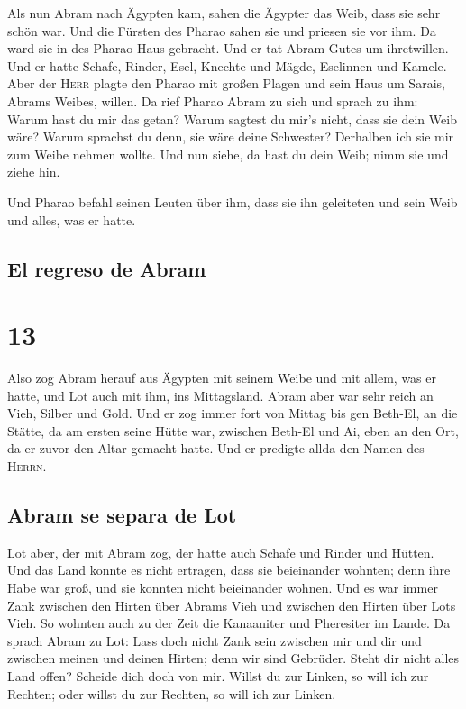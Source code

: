  Als nun Abram nach Ägypten kam, sahen die Ägypter das
Weib, dass sie sehr schön war.  Und die Fürsten des
Pharao sahen sie und priesen sie vor ihm. Da ward sie in des Pharao Haus
gebracht.  Und er tat Abram Gutes um ihretwillen. Und er
hatte Schafe, Rinder, Esel, Knechte und Mägde, Eselinnen und Kamele.
 Aber der \textsc{Herr} plagte den Pharao mit großen
Plagen und sein Haus um Sarais, Abrams Weibes, willen. 
Da rief Pharao Abram zu sich und sprach zu ihm: Warum hast du mir das
getan? Warum sagtest du mir's nicht, dass sie dein Weib wäre?
 Warum sprachst du denn, sie wäre deine Schwester?
Derhalben ich sie mir zum Weibe nehmen wollte. Und nun siehe, da hast du
dein Weib; nimm sie und ziehe hin.

 Und Pharao befahl seinen Leuten über ihm, dass sie ihn
geleiteten und sein Weib und alles, was er hatte.

\hypertarget{el-regreso-de-abram}{%
\subsection{El regreso de Abram}\label{el-regreso-de-abram}}

\hypertarget{section-12}{%
\section{13}\label{section-12}}

 Also zog Abram herauf aus Ägypten mit seinem Weibe und
mit allem, was er hatte, und Lot auch mit ihm, ins Mittagsland.
 Abram aber war sehr reich an Vieh, Silber und Gold.
 Und er zog immer fort von Mittag bis gen Beth-El, an die
Stätte, da am ersten seine Hütte war, zwischen Beth-El und Ai,
 eben an den Ort, da er zuvor den Altar gemacht hatte. Und
er predigte allda den Namen des \textsc{Herrn}.

\hypertarget{abram-se-separa-de-lot}{%
\subsection{Abram se separa de Lot}\label{abram-se-separa-de-lot}}

 Lot aber, der mit Abram zog, der hatte auch Schafe und
Rinder und Hütten.  Und das Land konnte es nicht ertragen,
dass sie beieinander wohnten; denn ihre Habe war groß, und sie konnten
nicht beieinander wohnen.  Und es war immer Zank zwischen
den Hirten über Abrams Vieh und zwischen den Hirten über Lots Vieh. So
wohnten auch zu der Zeit die Kanaaniter und Pheresiter im Lande.
 Da sprach Abram zu Lot: Lass doch nicht Zank sein
zwischen mir und dir und zwischen meinen und deinen Hirten; denn wir
sind Gebrüder.  Steht dir nicht alles Land offen? Scheide
dich doch von mir. Willst du zur Linken, so will ich zur Rechten; oder
willst du zur Rechten, so will ich zur Linken.

